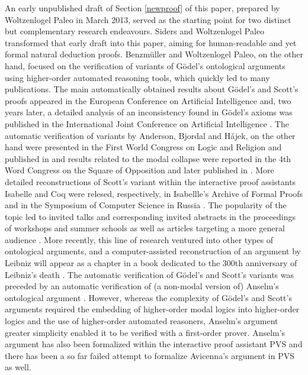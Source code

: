 \documentclass[smallextended]{svjour3}
\begin{document}
An early unpublished draft of Section \ref{newproof} of this paper,
prepared by Woltzenlogel Paleo in March 2013, served as the starting
point for two distinct but complementary research endeavours. Siders
and Woltzenlogel Paleo transformed that early draft into this paper,
aiming for human-readable and yet formal natural deduction proofs.
Benzm\"uller and Woltzenlogel Paleo, on the other hand, focused on the
verification of variants of G\"odel's ontological arguments using
higher-order automated reasoning tools, which quickly led to many
publications. The main automatically obtained results about G\"odel's
and Scott's proofs appeared in the European Conference on Artificial
Intelligence \citep{ECAI2014} and, two years later, a detailed
analysis of an inconsistency found in G\"odel's axioms was published
in the International Joint Conference on Artificial Intelligence
\citep{IJCAI2016}. The automatic verification of variants by Anderson,
Bjordal and H\'ajek, on the other hand were presented in the First
World Congress on Logic and Religion
\citep{WorldCongressLogicAndReligion} and published in
\citep{AndersonHajekControversy} and results related to the modal
collapse were reported in the 4th Word Congress on the Square of
Opposition \citep{SquareOfOpposition} and later published in
\citep{ModalCollapse}. More detailed reconstructions of Scott's
variant within the interactive proof assistants Isabelle and Coq were
relesed, respectively, in Isabellle's Archive of Formal Proofs
\citep{IsabelleGod} and in the Symposium of Computer Science in Russia
\citep{CSRModalLogicInCoq}. The popularity of the topic led to invited
talks and corresponding invited abstracts in the proceedings of
workshops \citep{WADT,WADTPreProceedings,IWIL} and summer schools
\citep{SpiritualQuest,ReasoningWebSummerSchool} as well as articles
targeting a more general audience \citep{AustrianComputerSociety}.
More recently, this line of research ventured into other types of
ontological arguments, and a computer-assisted reconstruction of an
argument by Leibniz will appear as a chapter in a book dedicated to
the 300th anniversary of Leibniz's death
\citep{LeibnizOntologicalProof}. The automatic verification of G\"odel's
and Scott's variants \citep{ECAI2014} was preceded by an automatic
verification of (a non-modal version of) Anselm's ontological argument
\citep{ZaltaOppenheimer}. However, whereas the complexity of G\"odel's
and Scott's arguments required the embedding of higher-order modal
logics into higher-order logics and the use of higher-order automated
reasoners, Anselm's argument greater simplicity enabled it to be
verified with a first-order prover. Anselm's argument has also been
formalized within the interactive proof assistant PVS \citep{Rushby}
and there has been a so far failed attempt to formalize Avicenna's
argument in PVS as well.
\end{document}
